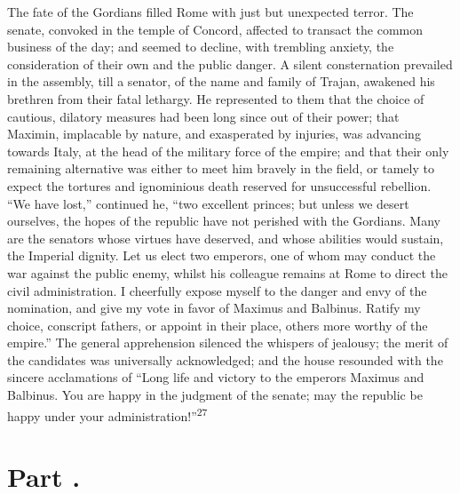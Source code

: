 The fate of the Gordians filled Rome with just but unexpected
terror. The senate, convoked in the temple of Concord, affected
to transact the common business of the day; and seemed to
decline, with trembling anxiety, the consideration of their own
and the public danger. A silent consternation prevailed in the
assembly, till a senator, of the name and family of Trajan,
awakened his brethren from their fatal lethargy. He represented
to them that the choice of cautious, dilatory measures had been
long since out of their power; that Maximin, implacable by
nature, and exasperated by injuries, was advancing towards Italy,
at the head of the military force of the empire; and that their
only remaining alternative was either to meet him bravely in the
field, or tamely to expect the tortures and ignominious death
reserved for unsuccessful rebellion. “We have lost,” continued
he, “two excellent princes; but unless we desert ourselves, the
hopes of the republic have not perished with the Gordians. Many
are the senators whose virtues have deserved, and whose abilities
would sustain, the Imperial dignity. Let us elect two emperors,
one of whom may conduct the war against the public enemy, whilst
his colleague remains at Rome to direct the civil administration.
I cheerfully expose myself to the danger and envy of the
nomination, and give my vote in favor of Maximus and Balbinus.
Ratify my choice, conscript fathers, or appoint in their place,
others more worthy of the empire.” The general apprehension
silenced the whispers of jealousy; the merit of the candidates
was universally acknowledged; and the house resounded with the
sincere acclamations of “Long life and victory to the emperors
Maximus and Balbinus. You are happy in the judgment of the
senate; may the republic be happy under your administration!”\textsuperscript{27}


\section{Part \thesection.}


